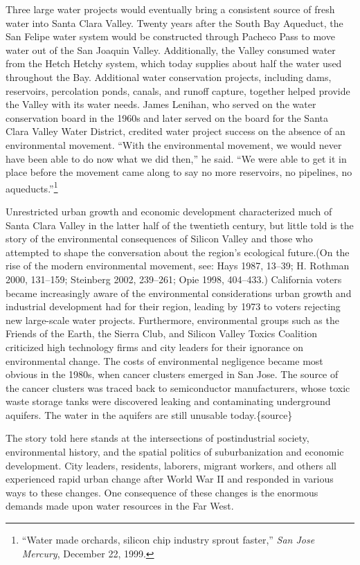 \documentclass[11pt,article,oneside]{memoir}
\begin{document}
Three large water projects would eventually bring a consistent source of
fresh water into Santa Clara Valley. Twenty years after the South Bay
Aqueduct, the San Felipe water system would be constructed through
Pacheco Pass to move water out of the San Joaquin Valley. Additionally,
the Valley consumed water from the Hetch Hetchy system, which today
supplies about half the water used throughout the Bay. Additional water
conservation projects, including dams, reservoirs, percolation ponds,
canals, and runoff capture, together helped provide the Valley with its
water needs. James Lenihan, who served on the water conservation board
in the 1960s and later served on the board for the Santa Clara Valley
Water District, credited water project success on the absence of an
environmental movement. ``With the environmental movement, we would
never have been able to do now what we did then,'' he said. ``We were
able to get it in place before the movement came along to say no more
reservoirs, no pipelines, no aqueducts.''\footnote{``Water made
  orchards, silicon chip industry sprout faster,'' \emph{San Jose
  Mercury}, December 22, 1999.}

Unrestricted urban growth and economic development characterized much of
Santa Clara Valley in the latter half of the twentieth century, but
little told is the story of the environmental consequences of Silicon
Valley and those who attempted to shape the conversation about the
region's ecological future.(On the rise of the modern environmental
movement, see: Hays 1987, 13--39; H. Rothman 2000, 131--159; Steinberg
2002, 239--261; Opie 1998, 404--433.) California voters became
increasingly aware of the environmental considerations urban growth and
industrial development had for their region, leading by 1973 to voters
rejecting new large-scale water projects. Furthermore, environmental
groups such as the Friends of the Earth, the Sierra Club, and Silicon
Valley Toxics Coalition criticized high technology firms and city
leaders for their ignorance on environmental change. The costs of
environmental negligence became most obvious in the 1980s, when cancer
clusters emerged in San Jose. The source of the cancer clusters was
traced back to semiconductor manufacturers, whose toxic waste storage
tanks were discovered leaking and contaminating underground aquifers.
The water in the aquifers are still unusable today.\{source\}

The story told here stands at the intersections of postindustrial
society, environmental history, and the spatial politics of
suburbanization and economic development. City leaders, residents,
laborers, migrant workers, and others all experienced rapid urban change
after World War II and responded in various ways to these changes. One
consequence of these changes is the enormous demands made upon water
resources in the Far West.
\end{document}
